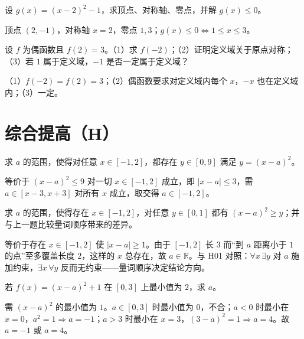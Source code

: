 \begin{problem}
设 $g(x)=(x-2)^2-1$，求顶点、对称轴、零点，并解 $g(x)\le0$。
\end{problem}
\begin{solution}
顶点 $(2,-1)$，对称轴 $x=2$，零点 $1,3$；$g(x)\le0\iff 1\le x\le3$。
\end{solution}

\begin{problem}
设 $f$ 为偶函数且 $f(2)=3$。（1）求 $f(-2)$；（2）证明定义域关于原点对称；（3）若 $1$ 属于定义域，$-1$ 是否一定属于定义域？
\end{problem}
\begin{solution}
（1）$f(-2)=f(2)=3$；（2）偶函数要求对定义域内每个 $x$，$-x$ 也在定义域内；（3）一定。
\end{solution}

\section{综合提高（H）}

\begin{problem}
求 $a$ 的范围，使得对任意 $x\in[-1,2]$，都存在 $y\in[0,9]$ 满足 $y=(x-a)^2$。
\end{problem}
\begin{solution}
等价于 $(x-a)^2\le9$ 对一切 $x\in[-1,2]$ 成立，即 $|x-a|\le3$，需 $a\in[x-3,x+3]$ 对所有 $x$ 成立，取交得 $a\in[-1,2]$。
\end{solution}

\begin{problem}
求 $a$ 的范围，使得存在 $x\in[-1,2]$，对任意 $y\in[0,1]$ 都有 $(x-a)^2\ge y$；并与上一题比较量词顺序带来的差异。
\end{problem}
\begin{solution}
等价于存在 $x\in[-1,2]$ 使 $|x-a|\ge1$。由于 $[-1,2]$ 长 $3$ 而“到 $a$ 距离小于 $1$ 的点”至多覆盖长度 $2$，这样的 $x$ 总存在，故 $a\in\mathbb{R}$。与 H01 对照：$\forall x\,\exists y$ 对 $a$ 施加约束，$\exists x\,\forall y$ 反而无约束——量词顺序决定结论方向。
\end{solution}

\begin{problem}
若 $f(x)=(x-a)^2+1$ 在 $[0,3]$ 上最小值为 $2$，求 $a$。
\end{problem}
\begin{solution}
需 $(x-a)^2$ 的最小值为 $1$。$a\in[0,3]$ 时最小值为 $0$，不合；$a<0$ 时最小在 $x=0$，$a^2=1\Rightarrow a=-1$；$a>3$ 时最小在 $x=3$，$(3-a)^2=1\Rightarrow a=4$。故 $a=-1$ 或 $a=4$。
\end{solution}

